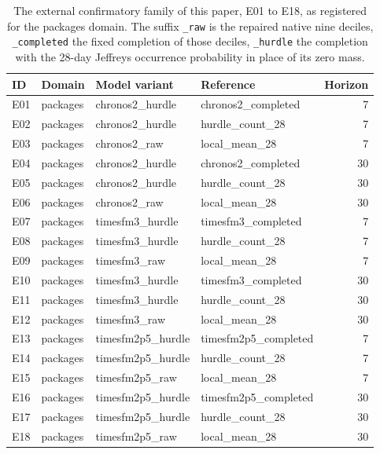 \begin{table}[htbp]
\centering\small
\caption{The external confirmatory family of this paper, E01 to E18, as registered for the packages domain.
The suffix \texttt{\_raw} is the repaired native nine deciles, \texttt{\_completed} the fixed completion of
those deciles, \texttt{\_hurdle} the completion with the 28-day Jeffreys occurrence probability in place of
its zero mass.}
\label{tab:s2family}
\begin{tabular}{llllr}
\toprule
ID & Domain & Model variant & Reference & Horizon \\
\midrule
E01 & packages & chronos2\_hurdle & chronos2\_completed & 7 \\
E02 & packages & chronos2\_hurdle & hurdle\_count\_28 & 7 \\
E03 & packages & chronos2\_raw & local\_mean\_28 & 7 \\
E04 & packages & chronos2\_hurdle & chronos2\_completed & 30 \\
E05 & packages & chronos2\_hurdle & hurdle\_count\_28 & 30 \\
E06 & packages & chronos2\_raw & local\_mean\_28 & 30 \\
E07 & packages & timesfm3\_hurdle & timesfm3\_completed & 7 \\
E08 & packages & timesfm3\_hurdle & hurdle\_count\_28 & 7 \\
E09 & packages & timesfm3\_raw & local\_mean\_28 & 7 \\
E10 & packages & timesfm3\_hurdle & timesfm3\_completed & 30 \\
E11 & packages & timesfm3\_hurdle & hurdle\_count\_28 & 30 \\
E12 & packages & timesfm3\_raw & local\_mean\_28 & 30 \\
E13 & packages & timesfm2p5\_hurdle & timesfm2p5\_completed & 7 \\
E14 & packages & timesfm2p5\_hurdle & hurdle\_count\_28 & 7 \\
E15 & packages & timesfm2p5\_raw & local\_mean\_28 & 7 \\
E16 & packages & timesfm2p5\_hurdle & timesfm2p5\_completed & 30 \\
E17 & packages & timesfm2p5\_hurdle & hurdle\_count\_28 & 30 \\
E18 & packages & timesfm2p5\_raw & local\_mean\_28 & 30 \\
\bottomrule
\end{tabular}
\end{table}

